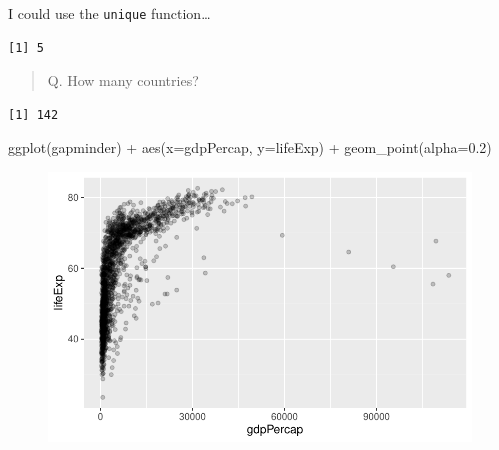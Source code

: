 \documentclass[
  letterpaper,
  DIV=11,
  numbers=noendperiod]{scrartcl}
\newenvironment{Shaded}{\begin{snugshade}}{\end{snugshade}}
\newcommand{\AttributeTok}[1]{\textcolor[rgb]{0.40,0.45,0.13}{#1}}
\newcommand{\FloatTok}[1]{\textcolor[rgb]{0.68,0.00,0.00}{#1}}
\newcommand{\FunctionTok}[1]{\textcolor[rgb]{0.28,0.35,0.67}{#1}}
\newcommand{\NormalTok}[1]{\textcolor[rgb]{0.00,0.23,0.31}{#1}}
\newcommand{\SpecialCharTok}[1]{\textcolor[rgb]{0.37,0.37,0.37}{#1}}
\begin{document}
I could use the \texttt{unique} function\ldots{}

\begin{Shaded}
\end{Shaded}

\begin{verbatim}
[1] 5
\end{verbatim}

\begin{quote}
Q. How many countries?
\end{quote}

\begin{Shaded}
\end{Shaded}

\begin{verbatim}
[1] 142
\end{verbatim}

\begin{Shaded}
\begin{Highlighting}[]
\FunctionTok{ggplot}\NormalTok{(gapminder) }\SpecialCharTok{+}
  \FunctionTok{aes}\NormalTok{(}\AttributeTok{x=}\NormalTok{gdpPercap, }\AttributeTok{y=}\NormalTok{lifeExp) }\SpecialCharTok{+}
  \FunctionTok{geom\_point}\NormalTok{(}\AttributeTok{alpha=}\FloatTok{0.2}\NormalTok{)}
\end{Highlighting}
\end{Shaded}

\begin{figure}[H]

{\centering \includegraphics{Class05_files/figure-pdf/unnamed-chunk-27-1.pdf}

}

\end{figure}
\end{document}
